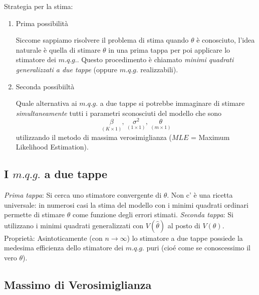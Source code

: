 \documentclass[a4paper]{report}
\theoremstyle{remark}
\begin{document}
Strategia per la stima:

\begin{enumerate}
\item Prima possibilit\`{a}

Siccome sappiamo risolvere il problema di stima quando $\theta $ \`{e}
conosciuto, l'idea naturale \`{e} quella di stimare $\theta $ in una prima
tappa per poi applicare lo stimatore dei $m.q.g.$. Questo procedimento \`{e}
chiamato \textit{minimi quadrati generalizzati a due tappe} (oppure $m.q.g.$
realizzabili).

\item Seconda possibiilt\`{a}

Quale alternativa ai $m.q.g.$ a due tappe si potrebbe immaginare di stimare 
\textit{simultaneamente} tutti i parametri sconosciuti del modello che sono 
\begin{equation*}
\underset{(K\times 1)}{\beta },\ \underset{(1\times 1)}{\sigma ^{2}},\ 
\underset{(m\times 1)}{\theta }
\end{equation*}%
utilizzando il metodo di massima verosimiglianza ($MLE$ = Maximum Likelihood
Estimation).
\end{enumerate}

\subsection{I $m.q.g.$ a due tappe}

\emph{Prima tappa}: Si cerca uno stimatore convergente di $\theta $. Non c'%
\`{e} una ricetta universale: in numerosi casi la stima del modello con i
minimi quadrati ordinari permette di stimare $\theta $ come funzione degli
errori stimati. \newline
\newline
\noindent \emph{Seconda tappa}: Si utilizzano i minimi quadrati
generalizzati con $V(\hat{\theta})$ al posto di $V(\theta )$. \newline
\newline
\noindent Propriet\`{a}: Asintoticamente (con $n\rightarrow \infty $) lo
stimatore a due tappe possiede la medesima efficienza dello stimatore dei $%
m.q.g.$ puri (cio\'{e} come se conoscessimo il vero $\theta $).

\subsection{Massimo di Verosimiglianza}
\end{document}
